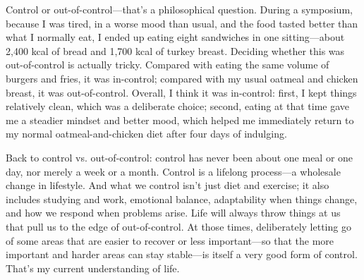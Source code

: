 Control or out-of-control—that’s a philosophical question. During a symposium, because I was tired, in a worse mood than usual, and the food tasted better than what I normally eat, I ended up eating eight sandwiches in one sitting—about 2,400 kcal of bread and 1,700 kcal of turkey breast. Deciding whether this was out-of-control is actually tricky. Compared with eating the same volume of burgers and fries, it was in-control; compared with my usual oatmeal and chicken breast, it was out-of-control. Overall, I think it was in-control: first, I kept things relatively clean, which was a deliberate choice; second, eating at that time gave me a steadier mindset and better mood, which helped me immediately return to my normal oatmeal-and-chicken diet after four days of indulging.

Back to control vs. out-of-control: control has never been about one meal or one day, nor merely a week or a month. Control is a lifelong process—a wholesale change in lifestyle. And what we control isn’t just diet and exercise; it also includes studying and work, emotional balance, adaptability when things change, and how we respond when problems arise. Life will always throw things at us that pull us to the edge of out-of-control. At those times, deliberately letting go of some areas that are easier to recover or less important—so that the more important and harder areas can stay stable—is itself a very good form of control. That’s my current understanding of life.